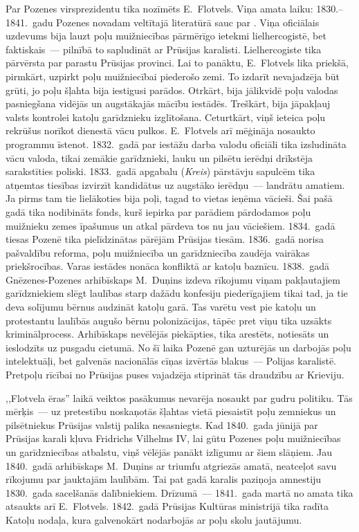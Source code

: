 \documentclass[twoside,a5paper,12pt,fleqn,openany]{extbook}
\newcommand{\detxti}[1]{\textit{\textgerman{#1}}}
\begin{document}
Par Pozenes virsprezidentu tika nozīmēts E.~Flotvels. Viņa amata laiku: 1830.--1841.~gadu Pozenes novadam veltītajā literatūrā sauc par . Viņa oficiālais uzdevums bija lauzt poļu muižniecības pārmērīgo ietekmi lielhercogistē, bet faktiskais~--- pilnībā to sapludināt ar Prūsijas karalisti. Lielhercogiste tika pārvērsta par parastu Prūsijas provinci. Lai to panāktu, E.~Flotvels lika priekšā, pirmkārt, uzpirkt poļu muižniecībai piederošo zemi. To izdarīt nevajadzēja būt grūti, jo poļu šļahta bija iestigusi parādos. Otrkārt, bija jālikvidē poļu valodas pasniegšana vidējās un augstākajās mācību iestādēs. Treškārt, bija jāpakļauj valsts kontrolei katoļu garīdznieku izglītošana. Ceturtkārt, viņš ieteica poļu rekrūšus norīkot dienestā vācu pulkos. E.~Flotvels arī mēģināja nosaukto programmu īstenot. 1832.~gadā par iestāžu darba valodu oficiāli tika izsludināta vācu valoda, tikai zemākie garīdznieki, lauku un pilsētu ierēdņi drīkstēja sarakstīties poliski. 1833.~gadā apgabalu (\detxti{Kreis}) pārstāvju sapulcēm tika atņemtas tiesības izvirzīt kandidātus uz augstāko ierēdņu~--- landrātu amatiem. Ja pirms tam tie lielākoties bija poļi, tagad to vietas ieņēma vācieši. Šai pašā gadā tika nodibināts fonds, kurš iepirka par parādiem pārdodamos poļu muižnieku zemes īpašumus un atkal pārdeva tos nu jau vāciešiem. 1834.~gadā tiesas Pozenē tika pielīdzinātas pārējām Prūsijas tiesām. 1836.~gadā norisa pašvaldību reforma, poļu muižniecība un garīdzniecība zaudēja vairākas priekšrocības. Varas iestādes nonāca konfliktā ar katoļu baznīcu. 1838.~gadā Gnēzenes-Pozenes arhibīskaps M.~Duņins izdeva rīkojumu viņam pakļautajiem garīdzniekiem slēgt laulības starp dažādu konfesiju piederīgajiem tikai tad, ja tie deva solījumu bērnus audzināt katoļu garā. Tas varētu vest pie katoļu un protestantu laulībās augušo bērnu polonizācijas, tāpēc pret viņu tika uzsākts kriminālprocess. Arhibīskaps nevēlējās piekāpties, tika arestēts, notiesāts un ieslodzīts uz pusgadu cietumā. No šī laika Pozenē gan uzturējās un darbojās poļu intelektuāļi, bet galvenās nacionālās cīņas izvērtās blakus~--- Polijas karalistē. Pretpoļu rīcībai no Prūsijas puses vajadzēja stiprināt tās draudzību ar Krieviju.

,,Flotvela ēras'' laikā veiktos pasākumus nevarēja nosaukt par gudru politiku. Tās mērķis~--- uz pretestību noskaņotās šļahtas vietā piesaistīt poļu zemniekus un pilsētniekus Prūsijas valstij palika nesasniegts. Kad 1840.~gada jūnijā par Prūsijas karali kļuva Fridrichs Vilhelms IV, lai gūtu Pozenes poļu muižniecības un garīdzniecības atbalstu, viņš vēlējās panākt izlīgumu ar šiem slāņiem. Jau 1840.~gadā arhibīskaps M.~Duņins ar triumfu atgriezās amatā, neatceļot savu rīkojumu par jauktajām laulībām. Tai pat gadā karalis paziņoja amnestiju 1830.~gada sacelšanās dalībniekiem. Drīzumā~--- 1841.~gada martā no amata tika atsaukts arī E.~Flotvels. 1842.~gadā Prūsijas Kultūras ministrijā tika radīta Katoļu nodaļa, kura galvenokārt nodarbojās ar poļu skolu jautājumu.
\end{document}
